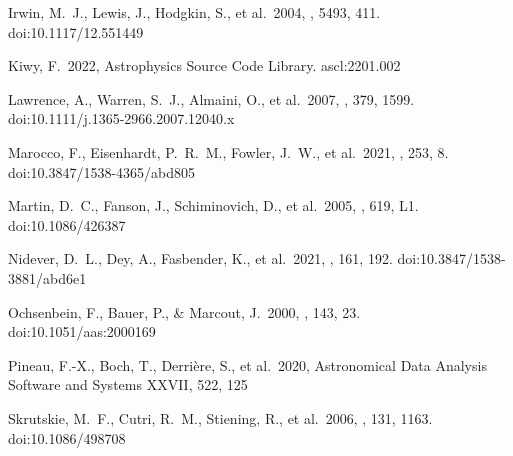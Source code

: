 \documentclass[twocolumn]{aastex631}
\begin{document}
\begin{thebibliography}{}
 Irwin, M.~J., Lewis, J., Hodgkin, S., et al.\ 2004, \procspie, 5493, 411. doi:10.1117/12.551449

 Kiwy, F.\ 2022, Astrophysics Source Code Library. ascl:2201.002

 Lawrence, A., Warren, S.~J., Almaini, O., et al.\ 2007, \mnras, 379, 1599. doi:10.1111/j.1365-2966.2007.12040.x

 Marocco, F., Eisenhardt, P.~R.~M., Fowler, J.~W., et al.\ 2021, \apjs, 253, 8. doi:10.3847/1538-4365/abd805

 Martin, D.~C., Fanson, J., Schiminovich, D., et al.\ 2005, \apjl, 619, L1. doi:10.1086/426387

 Nidever, D.~L., Dey, A., Fasbender, K., et al.\ 2021, \aj, 161, 192. doi:10.3847/1538-3881/abd6e1

 Ochsenbein, F., Bauer, P., \& Marcout, J.\ 2000, \aaps, 143, 23. doi:10.1051/aas:2000169

 Pineau, F.-X., Boch, T., Derri{\`e}re, S., et al.\ 2020, Astronomical Data Analysis Software and Systems XXVII, 522, 125

 Skrutskie, M.~F., Cutri, R.~M., Stiening, R., et al.\ 2006, \aj, 131, 1163. doi:10.1086/498708

\end{thebibliography}
\end{document}
